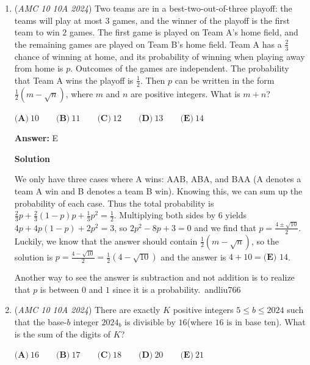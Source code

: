\begin{enumerate}
 
 \[AB = \sqrt{32}y+5x+7x = \left(\sqrt{32} \times \sqrt[4]{2}\right) + \left(12 \times \frac{1}{\sqrt[4]{2}}\right) = 2^{\frac{5}{2}} \times 2^{\frac{1}{4}} + \frac{12}{2^{\frac{1}{4}}}=\frac{20}{2^{\frac{1}{4}}}=\frac{20 \times 2^{\frac{3}{4}}}{2}=\frac{20 \sqrt[4]{8}}{2}= \boxed{\textbf{(D) }10\sqrt[4]{8}}\]



	\item (\textit{AMC 10 10A 2024}) Two teams are in a best-two-out-of-three playoff: the teams will play at most $3$ games, and the winner of the playoff is the first team to win $2$ games. The first game is played on Team A's home field, and the remaining games are played on Team B's home field. Team A has a $\frac{2}{3}$ chance of winning at home, and its probability of winning when playing away from home is $p$. Outcomes of the games are independent. The probability that Team A wins the playoff is $\frac{1}{2}$. Then $p$ can be written in the form $\frac{1}{2}(m - \sqrt{n})$, where $m$ and $n$ are positive integers. What is $m+n$? 


 $\textbf{(A)}~10\qquad\textbf{(B)}~11\qquad\textbf{(C)}~12\qquad\textbf{(D)}~13\qquad\textbf{(E)}~14$

 \textbf{Answer: }E



\textbf{Solution}

We only have three cases where A wins: AAB, ABA, and BAA (A denotes a team A win and B denotes a team B win). Knowing this, we can sum up the probability of each case. Thus the total probability is $\frac{2}{3}p+\frac{2}{3}(1-p)p+\frac{1}{3}p^2=\frac{1}{2}$. Multiplying  both sides by 6 yields $4p+4p(1-p)+2p^2=3$, so $2p^2-8p+3=0$ and we find that $p=\frac{4\pm\sqrt{10}}{2}$. Luckily, we know that the answer should contain  $\frac{1}{2}(m - \sqrt{n})$, so the solution is $p=\frac{4-\sqrt{10}}{2}=\frac{1}{2}(4-\sqrt{10})$ and the answer is $4+10=\boxed{\textbf{(E) } 14}$.

 Another way to see the answer is subtraction and not addition is to realize that $p$ is between $0$ and $1$ since it is a probability.~andliu766

 


	\item (\textit{AMC 10 10A 2024}) There are exactly $K$ positive integers $5 \leq b \leq 2024$ such that the base-$b$ integer $2024_{b}$ is divisible by $16$(where $16$ is in base ten). What is the sum of the digits of $K$?


 $\textbf{(A)}~16\qquad\textbf{(B)}~17\qquad\textbf{(C)}~18\qquad\textbf{(D)}~20\qquad\textbf{(E)}~21$


\end{enumerate}
